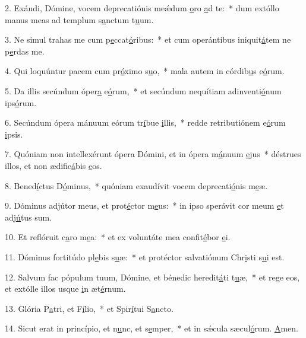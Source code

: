2. Exáudi, Dómine, vocem deprecatiónis meǽdum \uline{o}ro \uline{a}d te:~* dum extóllo manus meas ad templum s\uline{a}nctum t\uline{u}um.\par 
3. Ne simul trahas me cum p\uline{e}ccat\uline{ó}ribus:~* et cum operántibus iniquit\uline{á}tem ne p\uline{e}rdas me.\par 
4. Qui loquúntur pacem cum pr\uline{ó}ximo s\uline{u}o,~* mala autem in córdib\uline{u}s e\uline{ó}rum.\par 
5. Da illis secúndum óper\uline{a} e\uline{ó}rum,~* et secúndum nequítiam adinventi\uline{ó}num ips\uline{ó}rum.\par 
6. Secúndum ópera mánuum eórum tr\uline{í}bue \uline{i}llis,~* redde retributiónem e\uline{ó}rum \uline{i}psis.\par 
7. Quóniam non intellexérunt ópera Dómini, et in ópera m\uline{á}nuum \uline{e}jus~* déstrues illos, et non ædific\uline{á}bis \uline{e}os.\par 
8. Bened\uline{í}ctus D\uline{ó}minus,~* quóniam exaudívit vocem deprecati\uline{ó}nis m\uline{e}æ.\par 
9. Dóminus adjútor meus, et prot\uline{é}ctor m\uline{e}us:~* in ipso sperávit cor meum \uline{e}t adj\uline{ú}tus sum.\par 
10. Et reflóruit c\uline{a}ro m\uline{e}a:~* et ex voluntáte mea confit\uline{é}bor \uline{e}i.\par 
11. Dóminus fortitúdo pl\uline{e}bis s\uline{u}æ:~* et protéctor salvatiónum Chr\uline{i}sti s\uline{u}i est.\par 
12. Salvum fac pópulum tuum, Dómine, et bénedic heredit\uline{á}ti t\uline{u}æ,~* et rege eos, et extólle illos usque \uline{i}n æt\uline{é}rnum.\par 
13. Glória P\uline{a}tri, et F\uline{í}lio,~* et Spir\uline{í}tui S\uline{a}ncto.\par 
14. Sicut erat in princípio, et n\uline{u}nc, et s\uline{e}mper,~* et in sǽcula sæcul\uline{ó}rum. \uline{A}men.\par 
